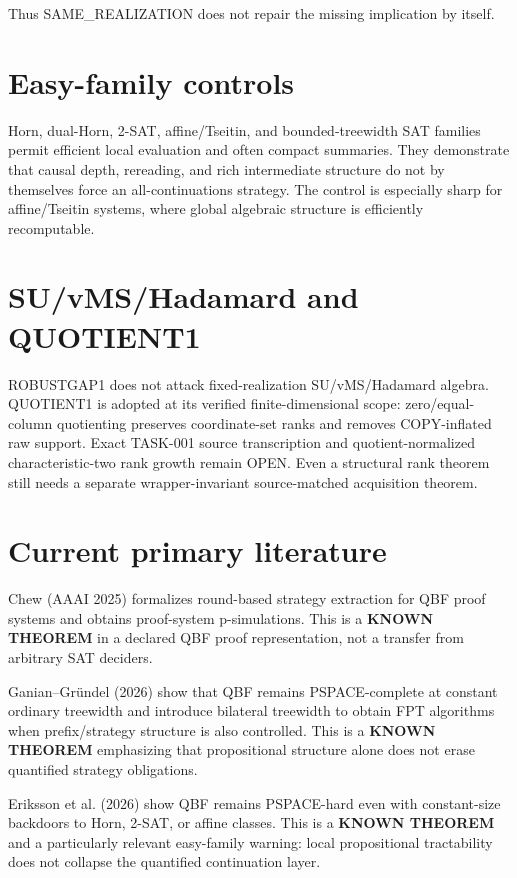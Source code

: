 \documentclass[11pt]{article}
\begin{document}
Thus SAME\_REALIZATION does not repair the missing implication by itself.

\section*{Easy-family controls}
Horn, dual-Horn, 2-SAT, affine/Tseitin, and bounded-treewidth SAT families permit efficient local evaluation and often compact summaries. They demonstrate that causal depth, rereading, and rich intermediate structure do not by themselves force an all-continuations strategy. The control is especially sharp for affine/Tseitin systems, where global algebraic structure is efficiently recomputable.

\section*{SU/vMS/Hadamard and QUOTIENT1}
ROBUSTGAP1 does not attack fixed-realization SU/vMS/Hadamard algebra. QUOTIENT1 is adopted at its verified finite-dimensional scope: zero/equal-column quotienting preserves coordinate-set ranks and removes COPY-inflated raw support. Exact TASK-001 source transcription and quotient-normalized characteristic-two rank growth remain OPEN. Even a structural rank theorem still needs a separate wrapper-invariant source-matched acquisition theorem.

\section*{Current primary literature}
Chew (AAAI 2025) formalizes round-based strategy extraction for QBF proof systems and obtains proof-system p-simulations. This is a \textbf{KNOWN THEOREM} in a declared QBF proof representation, not a transfer from arbitrary SAT deciders.

Ganian--Gr\"undel (2026) show that QBF remains PSPACE-complete at constant ordinary treewidth and introduce bilateral treewidth to obtain FPT algorithms when prefix/strategy structure is also controlled. This is a \textbf{KNOWN THEOREM} emphasizing that propositional structure alone does not erase quantified strategy obligations.

Eriksson et al. (2026) show QBF remains PSPACE-hard even with constant-size backdoors to Horn, 2-SAT, or affine classes. This is a \textbf{KNOWN THEOREM} and a particularly relevant easy-family warning: local propositional tractability does not collapse the quantified continuation layer.
\end{document}
